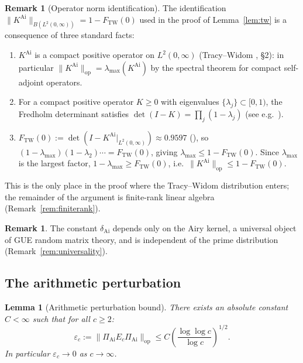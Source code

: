 \documentclass[12pt,a4paper]{amsart}
\newtheorem{lemma}[theorem]{Lemma}
\theoremstyle{definition}
\newtheorem{remark}[theorem]{Remark}
\newcommand{\KAi}{K^{\mathrm{Ai}}}
\newcommand{\PAi}{\Pi_{\mathrm{Ai}}}
\newcommand{\Ec}{E_c}
\newcommand{\norm}[1]{\|#1\|}
\newcommand{\FTW}{F_{\mathrm{TW}}(0)}
\newcommand{\dAi}{\delta_{\mathrm{Ai}}}
\begin{document}

\begin{remark}[Operator norm identification]\label{rem:opnorm_id}
The identification $\norm{\KAi}_{B(L^2(0,\infty))} = 1 - \FTW$
used in the proof of Lemma~\ref{lem:tw} is a consequence of three
standard facts:
\begin{enumerate}[\rm (a)]
  \item $\KAi$ is a compact positive operator on $L^2(0,\infty)$
    (Tracy--Widom \cite{TW1994}, \S{}2): in particular
    $\norm{\KAi}_{\mathrm{op}} = \lambda_{\max}(\KAi)$
    by the spectral theorem for compact self-adjoint operators.
  \item For a compact positive operator $K \ge 0$ with eigenvalues
    $\{\lambda_j\} \subset [0,1)$, the Fredholm determinant satisfies
    $\det(I-K) = \prod_j(1-\lambda_j)$
    (see e.g.\ \cite[Ch.~IX]{Kato1966}).
  \item $\FTW := \det(I - \KAi|_{L^2(0,\infty)}) \approx 0.9597$
    (\cite{TW1994, Bornemann2010}), so
    $(1 - \lambda_{\max})(1-\lambda_2)\cdots = \FTW$,
    giving $\lambda_{\max} \le 1 - \FTW$.
    Since $\lambda_{\max}$ is the largest factor,
    $1 - \lambda_{\max} \ge \FTW$, i.e.\
    $\norm{\KAi}_{\mathrm{op}} \le 1 - \FTW$.
\end{enumerate}
This is the only place in the proof where the Tracy--Widom distribution
enters; the remainder of the argument is finite-rank linear algebra
(Remark~\ref{rem:finiterank}).
\end{remark}

\begin{remark}
The constant $\dAi$ depends only on the Airy kernel, a universal object
of GUE random matrix theory, and is independent of the prime distribution
(Remark~\ref{rem:universality}).
\end{remark}

\subsection{The arithmetic perturbation}

\begin{lemma}[Arithmetic perturbation bound]\label{lem:mv}
There exists an absolute constant $C < \infty$ such that for all $c \ge 2$:
\begin{equation}\label{eq:mv}
  \varepsilon_c := \norm{\PAi\Ec\PAi}_{\mathrm{op}}
  \le C\left(\frac{\log\log c}{\log c}\right)^{1/2}.
\end{equation}
In particular $\varepsilon_c \to 0$ as $c \to \infty$.
\end{lemma}
\end{document}
